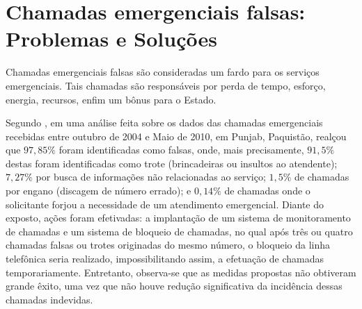 \section{Chamadas emergenciais falsas: Problemas e Soluções}
Chamadas emergenciais falsas são consideradas um fardo para os serviços emergenciais. Tais chamadas são responsáveis por perda de tempo, esforço, energia, recursos, enfim um bônus para o Estado.

Segundo \cite{waseem2010prank}, em uma análise feita sobre os dados das chamadas emergenciais recebidas entre outubro de 2004 e Maio de 2010, em Punjab, Paquistão, realçou que $97,85\%$ foram identificadas como falsas, onde, mais precisamente, $91,5\%$ destas foram identificadas como trote (brincadeiras ou insultos ao atendente); $7,27\%$ por busca de informações não relacionadas ao serviço; $1,5\%$ de chamadas por engano (discagem de número errado); e $0,14\%$ de chamadas onde o solicitante forjou a necessidade de um atendimento emergencial. 
Diante do exposto, ações foram efetivadas: a implantação de um sistema de monitoramento de chamadas e um sistema de bloqueio de chamadas, no qual após três ou quatro chamadas falsas ou trotes originadas do mesmo número, o bloqueio da linha telefônica seria realizado, impossibilitando assim, a efetuação de chamadas temporariamente.
Entretanto, observa-se que as medidas propostas não obtiveram grande êxito, uma vez que não houve redução significativa da incidência dessas chamadas indevidas.

